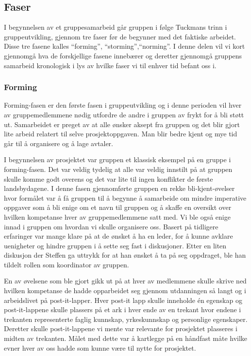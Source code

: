 \documentclass[a4paper,norsk,oneside]{article}
\begin{document}
\subsection{Faser}
I begynnelsen av et gruppesamarbeid går gruppen i følge Tuckmans trinn i gruppeutvikling, gjennom tre faser før de begynner med det faktiske arbeidet. Disse tre fasene kalles “forming”, “storming”,“norming”. I denne delen vil vi kort gjennomgå hva de forskjellige fasene innebærer og deretter gjennomgå gruppens samarbeid kronologisk i lys av hvilke faser vi til enhver tid befant oss i. \cite{bruce}

\subsubsection{Forming}
Forming-fasen er den første fasen i gruppeutvikling og i denne perioden vil hver av gruppemedlemmene nødig utfordre de andre i gruppen av frykt for å bli støtt ut. Samarbeidet er preget av at alle ønsker aksept fra gruppen og det blir gjort lite arbeid relatert til selve prosjektoppgaven. Man blir bedre kjent og mye tid går til å organisere og å lage avtaler.

I begynnelsen av prosjektet var gruppen et klassisk eksempel på en gruppe i forming-fasen. Det var veldig tydelig at alle var veldig innstilt på at gruppen skulle komme godt overens og det var lite til ingen konflikter de første landsbydagene. I denne fasen gjennomførte gruppen en rekke bli-kjent-øvelser hvor formålet var å få gruppen til å begynne å samarbeide om mindre imperative oppgaver som å bli enige om et navn til gruppen og å skaffe en oversikt over hvilken kompetanse hver av gruppemedlemmene satt med. Vi ble også enige innad i gruppen om hvordan vi skulle organisere oss. Basert på tidligere erfaringer var mange klare på at de ønsket å ha en leder, for å kunne avklare uenigheter og hindre gruppen i å sette seg fast i diskusjoner. Etter en liten diskusjon der Steffen ga uttrykk for at han ønsket å ta på seg oppdraget, ble han tildelt rollen som koordinator av gruppen.

En av øvelsene som ble gjort gikk ut på at hver av medlemmene skulle skrive ned hvilken kompetanse de hadde opparbeidet seg gjennom utdanningen så langt og i arbeidslivet på post-it-lapper. Hver post-it lapp skulle inneholde én egenskap og post-it-lappene skulle plassers på et ark i hver ende av en trekant hvor endene i trekanten representerte faglig kunnskap, yrkeskunnskap og personlige egenskaper. Deretter skulle post-it-lappene vi mente var relevante for prosjektet plasseres i midten av trekanten. Målet med dette var å kartlegge på en håndfast måte hvilke evner hver av oss hadde som kunne være til nytte for prosjektet.
\end{document}

